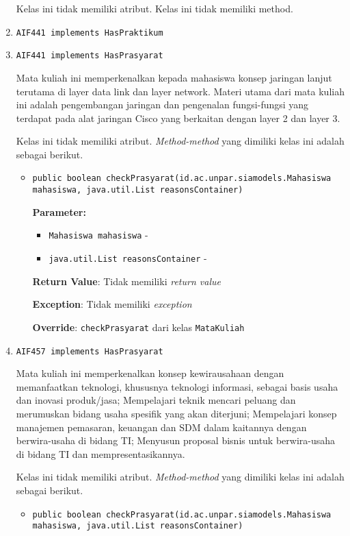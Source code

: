 \documentclass{article}
\begin{document}
\begin{enumerate}
Kelas ini tidak memiliki atribut. Kelas ini tidak memiliki method. \item \texttt{AIF441 implements HasPraktikum}

\item \texttt{AIF441 implements HasPrasyarat}

Mata kuliah ini memperkenalkan kepada mahasiswa konsep jaringan lanjut
 terutama di layer data link dan layer network. Materi utama dari mata kuliah
 ini adalah pengembangan jaringan dan pengenalan fungsi-fungsi yang terdapat
 pada alat jaringan Cisco yang berkaitan dengan layer 2 dan layer 3.

Kelas ini tidak memiliki atribut. \textit{Method-method} yang dimiliki kelas ini adalah sebagai berikut.
\begin{itemize}
\item \texttt{public boolean checkPrasyarat(id.ac.unpar.siamodels.Mahasiswa mahasiswa, java.util.List reasonsContainer)}

\textbf{Parameter:}
\begin{itemize}
\item \texttt{Mahasiswa mahasiswa} - 
\item \texttt{java.util.List reasonsContainer} - 
\end{itemize}
\textbf{Return Value}: Tidak memiliki \textit{return value}

\textbf{Exception}: Tidak memiliki \textit{exception}

\textbf{Override}: \texttt{checkPrasyarat} dari kelas \texttt{MataKuliah}

\end{itemize}
\item \texttt{AIF457 implements HasPrasyarat}

Mata kuliah ini memperkenalkan konsep kewirausahaan dengan memanfaatkan teknologi, khususnya
 teknologi informasi, sebagai basis usaha dan inovasi produk/jasa; Mempelajari
 teknik mencari peluang dan merumuskan bidang usaha spesifik yang akan
 diterjuni; Mempelajari konsep manajemen pemasaran, keuangan dan SDM dalam
 kaitannya dengan berwira-usaha di bidang TI; Menyusun proposal bisnis untuk
 berwira-usaha di bidang TI dan mempresentasikannya.

Kelas ini tidak memiliki atribut. \textit{Method-method} yang dimiliki kelas ini adalah sebagai berikut.
\begin{itemize}
\item \texttt{public boolean checkPrasyarat(id.ac.unpar.siamodels.Mahasiswa mahasiswa, java.util.List reasonsContainer)}


\end{itemize}
\end{enumerate}
\end{document}
